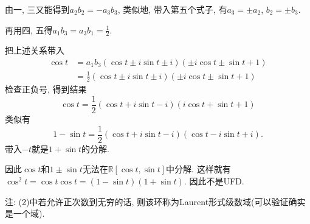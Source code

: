 \begin{solution}
\begin{enumerate}[(1)]
    由一, 三又能得到$a_2b_2 = -a_3b_3$, 类似地, 带入第五个式子, 有$a_3 = \pm a_2$, $b_2 = \pm b_3$.

    再用四, 五得$a_1b_3 = a_3b_1 = \frac{1}{2}$.

    把上述关系带入
    \[
    \begin{aligned}
        \cos t &= a_1b_3(\cos t \pm i\sin t \pm i)(\pm i\cos t \pm \sin t + 1)\\
        &= \frac{1}{2}(\cos t \pm i\sin t \pm i)(\pm i\cos t \pm \sin t + 1)
    \end{aligned}
    \]
    检查正负号, 得到结果
    \[
        \cos t = \frac{1}{2}(\cos t + i\sin t - i)(i\cos t + \sin t + 1)  
    \]
    类似有
    \[
        1 - \sin t = \frac{1}{2}(\cos t + i\sin t - i)(\cos t - i\sin t + i).
    \]
    带入$-t$就是$1 + \sin t$的分解.
    
    因此$\cos t$和$1 \pm \sin t$无法在$\mathbb{R}[\cos t, \sin t]$中分解. 这样就有$\cos^2 t = \cos t\cos t = (1 - \sin t)(1 + \sin t)$. 因此不是UFD.
\end{enumerate}
注: (2)中若允许正次数到无穷的话, 则该环称为Laurent形式级数域(可以验证确实是一个域).
\end{solution}